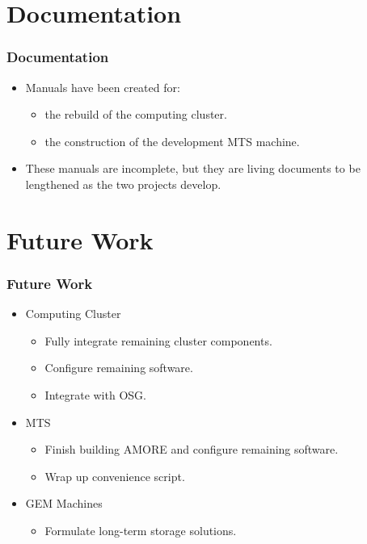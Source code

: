 \documentclass[aspectratio=169]{beamer}
\begin{document}


\section{Documentation}

\begin{frame}

  \frametitle{Documentation}

  \begin{itemize}
    \item Manuals have been created for:
      \begin{itemize}
        \item the rebuild of the computing cluster.
        \item the construction of the development MTS machine.
      \end{itemize}
    \item These manuals are incomplete, but they are living documents to be
      lengthened as the two projects develop.
  \end{itemize}


\end{frame}



\section{Future Work}

\begin{frame}

  \frametitle{Future Work}

  \begin{itemize}
    \item Computing Cluster
      \begin{itemize}
        \item Fully integrate remaining cluster components.
        \item Configure remaining software.
        \item Integrate with OSG.
      \end{itemize}
    \item MTS
      \begin{itemize}
      \item Finish building AMORE and configure remaining software.
      \item Wrap up convenience script.
      \end{itemize}
    \item GEM Machines
      \begin{itemize}
        \item Formulate long-term storage solutions.
      \end{itemize}
  \end{itemize}

\end{frame}
\end{document}

